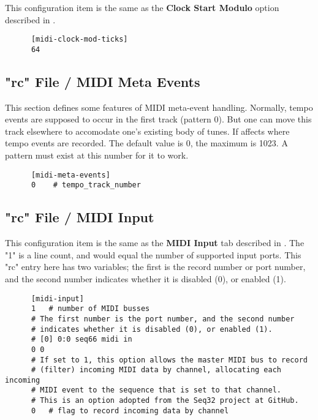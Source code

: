    This configuration item is the same as the
   \textbf{Clock Start Modulo} option described in
   .

   \begin{verbatim}
      [midi-clock-mod-ticks]
      64
   \end{verbatim}

\subsection{"rc" File / MIDI Meta Events}
\label{subsec:seq66_rc_file_midi_meta}

   This section defines some features of MIDI meta-event handling.  Normally,
   tempo events are supposed to occur in the first track (pattern 0).  But one
   can move this track elsewhere to accomodate one's existing body of tunes.
   If affects where tempo events are recorded.  The default value is 0, the
   maximum is 1023.  A pattern must exist at this number for it to work.

   \begin{verbatim}
      [midi-meta-events]
      0    # tempo_track_number
   \end{verbatim}

\subsection{"rc" File / MIDI Input}
\label{subsec:seq66_rc_file_midi_input}

   This configuration item is the same as the 
   \textbf{MIDI Input} tab described in
   .
   The "1" is a line count, and would equal the number of
   supported input ports.
   This "rc" entry here has two variables; the first is the record number or
   port number, and the second number indicates whether it is disabled (0),
   or enabled (1).

   \begin{verbatim}
      [midi-input]
      1   # number of MIDI busses
      # The first number is the port number, and the second number
      # indicates whether it is disabled (0), or enabled (1).
      # [0] 0:0 seq66 midi in
      0 0
      # If set to 1, this option allows the master MIDI bus to record
      # (filter) incoming MIDI data by channel, allocating each incoming
      # MIDI event to the sequence that is set to that channel.
      # This is an option adopted from the Seq32 project at GitHub.
      0   # flag to record incoming data by channel
   \end{verbatim}

